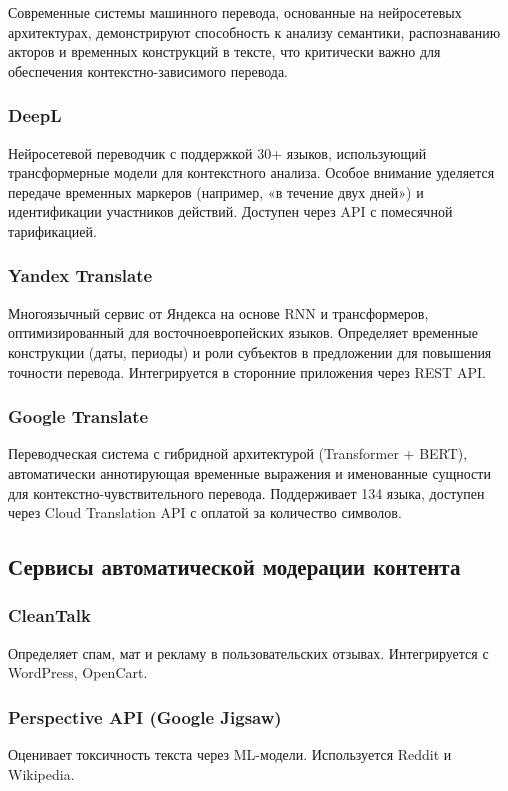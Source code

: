 Современные системы машинного перевода, основанные на нейросетевых архитектурах, демонстрируют способность к анализу семантики, распознаванию акторов и временных конструкций в тексте, что критически важно для обеспечения контекстно-зависимого перевода.

\subsubsection{DeepL}
Нейросетевой переводчик с поддержкой 30+ языков, использующий трансформерные модели для контекстного анализа. Особое внимание уделяется передаче временных маркеров (например, «в течение двух дней») и идентификации участников действий. Доступен через API с помесячной тарификацией.

\subsubsection{Yandex Translate}
Многоязычный сервис от Яндекса на основе RNN и трансформеров, оптимизированный для восточноевропейских языков. Определяет временные конструкции (даты, периоды) и роли субъектов в предложении для повышения точности перевода. Интегрируется в сторонние приложения через REST API.

\subsubsection{Google Translate}
Переводческая система с гибридной архитектурой (Transformer + BERT), автоматически аннотирующая временные выражения и именованные сущности для контекстно-чувствительного перевода. Поддерживает 134 языка, доступен через Cloud Translation API с оплатой за количество символов.

\subsection{Сервисы автоматической модерации контента}

\subsubsection{CleanTalk}
Определяет спам, мат и рекламу в пользовательских отзывах. Интегрируется с WordPress, OpenCart.

\subsubsection{Perspective API (Google Jigsaw)}
Оценивает токсичность текста через ML-модели. Используется Reddit и Wikipedia.


